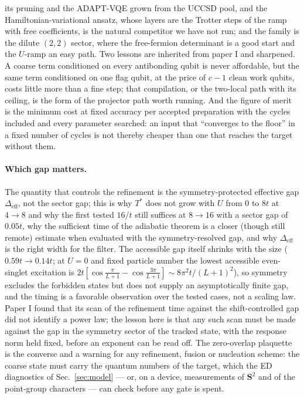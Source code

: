 \documentclass[a4paper,11pt,noarxiv]{quantumarticle}
\newcommand{\Deff}{\Delta_{\mathrm{eff}}}
\begin{document}
its pruning and the ADAPT-VQE grown from the UCCSD pool, and the
Hamiltonian-variational ansatz, whose layers are the Trotter steps of the
ramp with free coefficients, is the natural competitor we have not run;
and the family is the dilute $(2,2)$ sector, where the free-fermion
determinant is a good start and the $U$-ramp an easy path.  Two lessons
are inherited from paper I and sharpened.  A coarse term conditioned on
every antibonding qubit is never affordable, but the same term conditioned
on one flag qubit, at the price of $c-1$ clean work qubits, costs little
more than a fine step; that compilation, or the two-local path with its
ceiling, is the form of the projector path worth running.  And the figure
of merit is the minimum cost at fixed accuracy per accepted preparation
with the cycles included and every parameter searched: an input that
``converges to the floor'' in a fixed number of cycles is not thereby
cheaper than one that reaches the target without them.

\paragraph{Which gap matters.}
The quantity that controls the refinement is the symmetry-protected
effective gap $\Deff$, not the sector gap; this is why $T^*$ does not grow
with $U$ from $0$ to $8t$ at $4\to8$ and why the first tested $16/t$ still
suffices at $8\to16$ with a sector gap of $0.05t$, why the sufficient time
of the adiabatic theorem is a closer (though still remote) estimate when
evaluated with the symmetry-resolved gap, and why $\Deff$ is the right
width for the filter.  The accessible gap itself shrinks with the size
($0.59t\to0.14t$; at $U=0$ and fixed particle number the lowest
accessible even-singlet excitation is $2t[\cos\frac{\pi}{L+1}-\cos\frac{3\pi}{L+1}]\sim8\pi^2t/(L+1)^2$),
so symmetry excludes the forbidden states but does not supply an
asymptotically finite gap, and the timing is a favorable observation over
the tested cases, not a scaling law.  Paper I found that
its scan of the refinement time against the shift-controlled gap did not
identify a power law; the lesson here is that any such scan must be made
against the gap in the symmetry sector of the tracked state, with the
response norm held fixed, before an exponent can be read off.  The
zero-overlap plaquette is the converse and a warning for any refinement,
fusion or nucleation scheme: the coarse state must carry the quantum
numbers of the target, which the ED diagnostics of Sec.~\ref{sec:model}
--- or, on a device, measurements of $\mathbf S^2$ and of the point-group
characters --- can check before any gate is spent.
\end{document}
